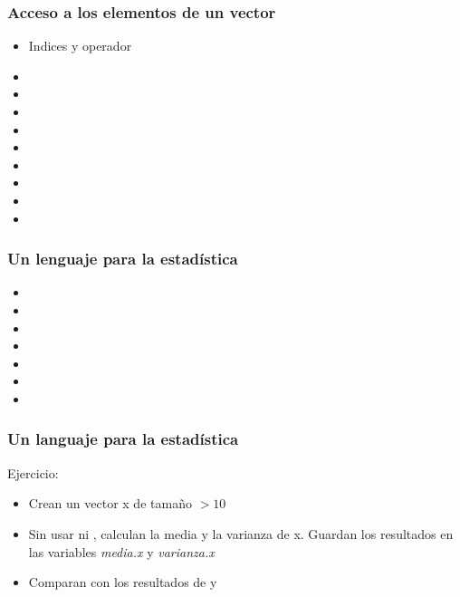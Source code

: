 \documentclass[mathserif]{beamer}
\begin{document}
\begin{frame}[plain,label=d16]%
\frametitle{Acceso a los elementos de un vector }
\begin{itemize}
  \item Indices y operador \structure{[~]}
  \item {}
  \item {}
  \item {}
  \item {}
  \item {}
  \item {}
  \item {}
  \item {}
  \item {}
\end{itemize}
\end{frame}%

\begin{frame}[plain,label=d17]%
\frametitle{Un lenguaje para la estad\'istica}
\begin{itemize}
  \item {}
  \item {}
  \item {}
  \item {}
  \item {}
  \item {}
  \item {}
\end{itemize}
\end{frame}%

\begin{frame}[plain,label=d18]%
\frametitle{Un languaje para la estad\'istica}
\begin{exampleblock}{Ejercicio:}
\begin{itemize}
   \item Crean un vector x de tama\~no $>10$
   \item \alert{Sin} usar  ni , calculan la media y la varianza de x. Guardan los resultados en las variables \emph{media.x} y \emph{varianza.x}
   \item Comparan con los resultados de  y 
\end{itemize}
\end{exampleblock}
\end{frame}%
\end{document}
